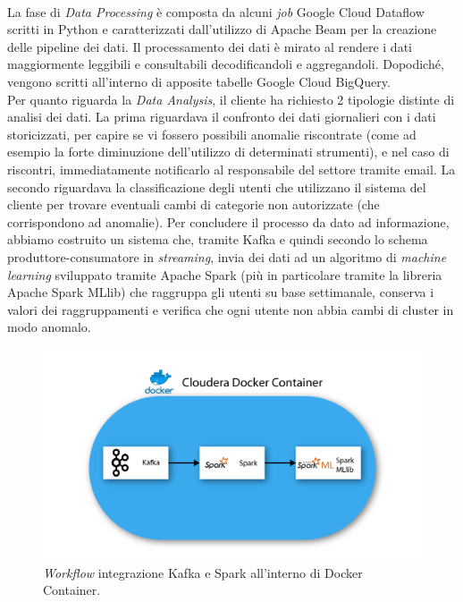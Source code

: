 \\
La fase di \emph{Data Processing} è composta da alcuni \emph{job} Google Cloud Dataflow scritti in Python e caratterizzati dall'utilizzo di Apache Beam per la creazione delle pipeline dei dati.
Il processamento dei dati è mirato al rendere i dati maggiormente leggibili e consultabili decodificandoli e aggregandoli. Dopodiché, vengono scritti all'interno di apposite tabelle Google Cloud BigQuery.
\\
Per quanto riguarda la \emph{Data Analysis}, il cliente ha richiesto 2 tipologie distinte di analisi dei dati.
La prima riguardava il confronto dei dati giornalieri con i dati storicizzati, per capire se vi fossero possibili anomalie riscontrate (come ad esempio la forte diminuzione dell'utilizzo di determinati strumenti), e nel caso di riscontri, immediatamente notificarlo al responsabile del settore tramite email.
La secondo riguardava la classificazione degli utenti che utilizzano il sistema del cliente per trovare eventuali cambi di categorie non autorizzate (che corrispondono ad anomalie). Per concludere il processo da dato ad informazione, abbiamo costruito un sistema che, tramite Kafka e quindi secondo lo schema produttore-consumatore in \emph{streaming}, invia dei dati ad un algoritmo di \emph{machine learning} sviluppato tramite Apache Spark (più in particolare tramite la libreria Apache Spark MLlib) che raggruppa gli utenti su base settimanale, conserva i valori dei raggruppamenti e verifica che ogni utente non abbia cambi di cluster in modo anomalo.\\
\begin{figure}[h!]
	\centering
	\includegraphics[scale=0.5]{figures/kafka_spark}
	\caption[Workflow integrazione Kafka e Spark.]{\emph{Workflow} integrazione Kafka e Spark all'interno di Docker Container.
		\label{fig:workflow2}}
\end{figure}	

